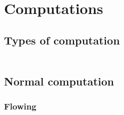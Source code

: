 \section*{Computations}\hypertarget{computations}{}\label{computations}

\subsection*{Types of computation}\hypertarget{types-of-computation}{}\label{types-of-computation}

\begin{align*}
  [ ~ 
  \KEY{Funcon} ~ & \NAMEHYPER{../Computations}{Computation-Types}{computation-types}
  ~ ]
\end{align*}
\subsection*{Normal computation}\hypertarget{normal-computation}{}\label{normal-computation}

\subsubsection*{Flowing}\hypertarget{flowing}{}\label{flowing}

